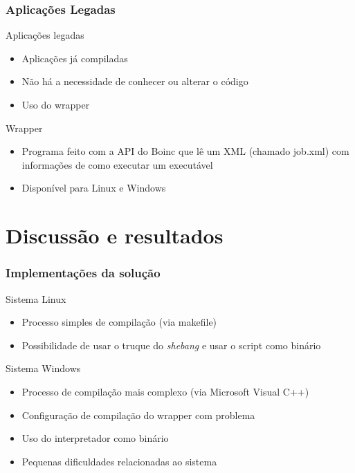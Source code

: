 \documentclass{beamer}
\begin{document}
\begin{frame}
  \frametitle{Aplicações Legadas}
  \begin{block}{Aplicações legadas}
  \begin{itemize}
    \item Aplicações já compiladas
    \item Não há a necessidade de conhecer ou alterar o código
    \item Uso do wrapper
  \end{itemize}
  \end{block}
  \begin{block}{Wrapper}
    \begin{itemize}
      \item Programa feito com a API do Boinc que lê um XML (chamado job.xml)  com informações de como executar um executável
      \item Disponível para Linux e Windows
    \end{itemize}
  \end{block}
\end{frame}


\section{Discussão e resultados} 

\begin{frame}
  \frametitle{Implementações da solução}
  \begin{block}{Sistema Linux}
    \begin{itemize}
      \item Processo simples de compilação (via makefile)
      \item Possibilidade de usar o truque do \textit{shebang} e usar o script como binário
    \end{itemize} 
  \end{block}

  \begin{block}{Sistema Windows}
    \begin{itemize}
      \item Processo de compilação mais complexo (via Microsoft Visual C++)
      \item Configuração de compilação do wrapper com problema
      \item Uso do interpretador como binário
      \item Pequenas dificuldades relacionadas ao sistema
    \end{itemize}
  \end{block}
\end{frame}
\end{document}
